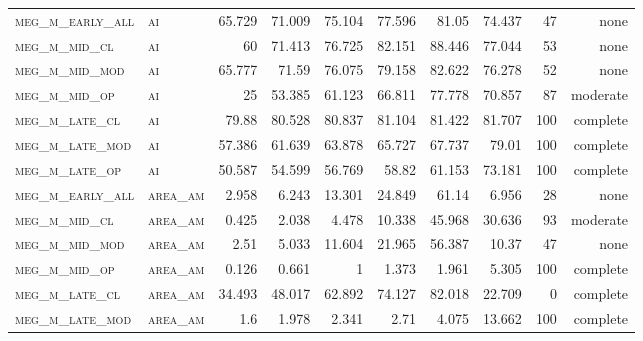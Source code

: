 \begin{landscape}
\begin{center}
\begin{footnotesize}
\begin{longtable}{llrrrrr|rrr}
\textsc{meg\_m\_early\_all} & \textsc{ai        }    & 65.729   & 71.009   & 75.104   & 77.596   & 81.05      & 74.437        & 47            & none              \\
\textsc{meg\_m\_mid\_cl   } & \textsc{ai        }    & 60       & 71.413   & 76.725   & 82.151   & 88.446     & 77.044        & 53            & none               \\
\textsc{meg\_m\_mid\_mod  } & \textsc{ai        }    & 65.777   & 71.59    & 76.075   & 79.158   & 82.622     & 76.278        & 52            & none               \\
\textsc{meg\_m\_mid\_op   } & \textsc{ai        }    & 25       & 53.385   & 61.123   & 66.811   & 77.778     & 70.857        & 87            & moderate              \\
\textsc{meg\_m\_late\_cl  } & \textsc{ai        }    & 79.88    & 80.528   & 80.837   & 81.104   & 81.422     & 81.707        & 100           & complete             \\
\textsc{meg\_m\_late\_mod } & \textsc{ai        }    & 57.386   & 61.639   & 63.878   & 65.727   & 67.737     & 79.01         & 100           & complete             \\
\textsc{meg\_m\_late\_op  } & \textsc{ai        }    & 50.587   & 54.599   & 56.769   & 58.82    & 61.153     & 73.181        & 100           & complete             \\
\textsc{meg\_m\_early\_all} & \textsc{area\_am  }    & 2.958    & 6.243    & 13.301   & 24.849   & 61.14      & 6.956         & 28            & none             \\
\textsc{meg\_m\_mid\_cl   } & \textsc{area\_am  }    & 0.425    & 2.038    & 4.478    & 10.338   & 45.968     & 30.636        & 93            & moderate              \\
\textsc{meg\_m\_mid\_mod  } & \textsc{area\_am  }    & 2.51     & 5.033    & 11.604   & 21.965   & 56.387     & 10.37         & 47            & none              \\
\textsc{meg\_m\_mid\_op   } & \textsc{area\_am  }    & 0.126    & 0.661    & 1        & 1.373    & 1.961      & 5.305         & 100           & complete             \\
\textsc{meg\_m\_late\_cl  } & \textsc{area\_am  }    & 34.493   & 48.017   & 62.892   & 74.127   & 82.018     & 22.709        & 0             & complete            \\
\textsc{meg\_m\_late\_mod } & \textsc{area\_am  }    & 1.6      & 1.978    & 2.341    & 2.71     & 4.075      & 13.662        & 100           & complete             \\

\end{longtable}
\end{footnotesize}
\end{center}
\end{landscape}
